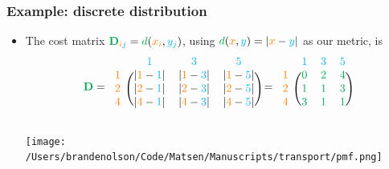 \documentclass[mathserif,compress,xcolor={dvipsnames}]{beamer}
\newcommand*\ba{\[ \begin{aligned}}
\newcommand*\ea{\end{aligned} \]}
\renewcommand\;{\,}
\begin{document}
\begin{frame}\frametitle{Example: discrete distribution}
\begin{itemize}
\item[]
The cost matrix ${\color{Green} \mathbf D}_{{\color{orange} i}{\color{ProcessBlue} j}} = {\color{Green} d}({\color{orange} x_i}, {\color{ProcessBlue} y_j})$, using 
${\color{Green} d}({\color{orange} x}, {\color{ProcessBlue} y}) = |{\color{orange} x} - {\color{ProcessBlue} y}|$ as our metric, is
\ba
{\color{Green} \mathbf D} = 
	\begin{blockarray}{cccc}
	& {\color{ProcessBlue} 1} & {\color{ProcessBlue} 3} & {\color{ProcessBlue} 5} \\
	\begin{block}{c(ccc)}
		{\color{orange} 1} & |{\color{orange} 1} - {\color{ProcessBlue} 1}| & |{\color{orange} 1} - {\color{ProcessBlue} 3}| & |{\color{orange} 1} - {\color{ProcessBlue} 5}| \\
		{\color{orange} 2} & |{\color{orange} 2} - {\color{ProcessBlue} 1}| & |{\color{orange} 2} - {\color{ProcessBlue} 3}| & |{\color{orange} 2} - {\color{ProcessBlue} 5}| \\
		{\color{orange} 4} & |{\color{orange} 4} - {\color{ProcessBlue} 1}| & |{\color{orange} 4} - {\color{ProcessBlue} 3}| & |{\color{orange} 4} - {\color{ProcessBlue} 5}| \\
	\end{block}
\end{blockarray}
=
\begin{blockarray}{cccc}
	& {\color{ProcessBlue} 1} & {\color{ProcessBlue} 3} & {\color{ProcessBlue} 5} \\
	\begin{block}{c(ccc)}
		{\color{orange} 1} & \color{Green}0 & \color{Green}2 & \color{Green}4 \\
		{\color{orange} 2} & \color{Green}1 & \color{Green}1 & \color{Green}3 \\
		{\color{orange} 4} & \color{Green}3 & \color{Green}1 & \color{Green}1 \\
	\end{block}
\end{blockarray}
\ea
\vspace{-3em}
\begin{center}
\texttt{[image: /Users/brandenolson/Code/Matsen/Manuscripts/transport/pmf.png]}
\end{center}
\end{itemize}
\end{frame}
\end{document}
